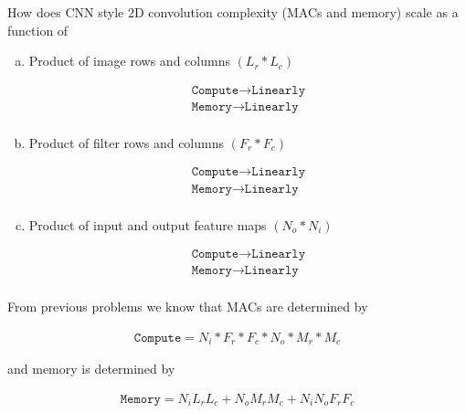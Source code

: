 \documentclass[11pt]{article}
\begin{document}
How does CNN style 2D convolution complexity (MACs and memory) scale as a
function of
\begin{enumerate}[(a)]\itemsep0pt
	\item Product of image rows and columns $(L_r*L_c)$
		\begin{solution}
			\begin{align}
				\texttt{Compute} \rightarrow \texttt{Linearly} \\
				\texttt{Memory} \rightarrow \texttt{Linearly} \\
			\end{align}
		\end{solution}
	\item Product of filter rows and columns $(F_r*F_c)$
		\begin{solution}
			\begin{align}
				\texttt{Compute} \rightarrow \texttt{Linearly} \\
				\texttt{Memory} \rightarrow \texttt{Linearly} \\
			\end{align}
		\end{solution}
	\item Product of input and output feature maps $(N_o * N_i)$
		\begin{solution}
			\begin{align}
				\texttt{Compute} \rightarrow \texttt{Linearly} \\
				\texttt{Memory} \rightarrow \texttt{Linearly} \\
			\end{align}
		\end{solution}
\end{enumerate}

From previous problems we know that MACs are determined by

\begin{align}
	\texttt{Compute} = N_i * F_r * F_c * N_o * M_r * M_c
\end{align}

and memory is determined by

\begin{align}
	\texttt{Memory} = N_i L_r L_c + N_o M_r M_c + N_i N_o F_r F_c
\end{align}
\end{document}
